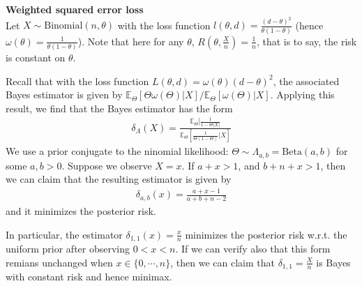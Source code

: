 \begin{example}
    \textbf{Weighted squared error loss}\\
    Let $X\sim\text{Binomial}(n,\theta)$ with the loss function $l(\theta,d)=\frac{(d-\theta)^2}{\theta(1-\theta)}$
    (hence $\omega(\theta)=\frac{1}{\theta(1-\theta)}$).
    Note that here for any $\theta$, $R(\theta,\frac{X}{n})=\frac{1}{n}$,
    that is to say, the risk is constant on $\theta$.

    Recall that with the loss function $L(\theta,d)=\omega(\theta)(d-\theta)^2$,
    the associated Bayes estimator is given by $\mathbb{E}_\Theta[\Theta\omega(\Theta)|X]/\mathbb{E}_\Theta[\omega(\Theta)|X]$.
    Applying this result, we find that the Bayes estimator has the form
    \begin{gather}
        \delta_\Lambda(X)=\frac{\mathbb{E}_\Theta[\frac{1}{1-\Theta|X]}}{\mathbb{E}_\Theta[\frac{1}{\Theta(1-\Theta)}|X]}
    \end{gather}
    We use a prior conjugate to the ninomial likelihood: $\Theta\sim\Lambda_{a,b}=\text{Beta}(a,b)$ for some $a,b>0$.
    Suppose we observe $X=x$. If $a+x>1$, and $b+n+x>1$, 
    then we can claim that the resulting estimator is given by
    \begin{gather}
        \delta_{a,b}(x)=\frac{a+x-1}{a+b+n-2}
    \end{gather}
    and it minimizes the posterior risk.

    In particular, the estimator $\delta_{1,1}(x)=\frac{x}{n}$ minimizes the posterior risk
    w.r.t. the uniform prior after observing $0<x<n$.
    If we can verify also that this form remians unchanged when $x\in\{0,\cdots,n\}$, 
    then we can claim that $\delta_{1,1}=\frac{X}{n}$ is Bayes with constant risk and hence minimax.


\end{example}
